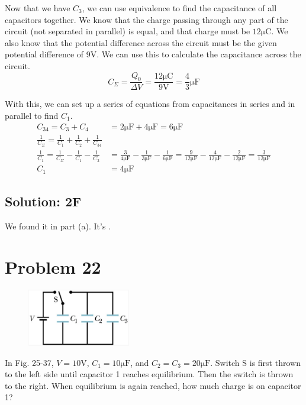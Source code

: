 \documentclass[12pt]{article}
\begin{document}
Now that we have $C_3$, we can use equivalence to find the capacitance of all capacitors together.
We know that the charge passing through any part of the circuit (not separated in parallel) is equal, and that charge must be $12\unit{\micro\coulomb}$.
We also know that the potential difference across the circuit must be the given potential difference of 9V. 
We can use this to calculate the capacitance across the circuit.
\[
    C_{\Sigma} = \frac{Q_0}{\Delta V} = \frac{12 \unit{\micro\coulomb}}{9 \unit{\volt}} = \frac{4}{3} \unit{\micro\farad}
\]

With this, we can set up a series of equations from capacitances in series and in parallel to find $C_1$.
\begin{align*}
    C_{34} = C_3 + C_4 &= 2 \unit{\micro\farad} + 4 \unit{\micro\farad} = 6 \unit{\micro\farad}\\
    \frac{1}{C_{\Sigma}} = \frac{1}{C_1} + \frac{1}{C_2} + \frac{1}{C_{34}}\\
    \frac{1}{C_1} = \frac{1}{C_{\Sigma}} - \frac{1}{C_1} - \frac{1}{C_2}
        &=  \frac{3}{4 \unit{\micro\farad}} - \frac{1}{3 \unit{\micro\farad}} - \frac{1}{6 \unit{\micro\farad}}
        =   \frac{9}{12 \unit{\micro\farad}} - \frac{4}{12 \unit{\micro\farad}} - \frac{2}{12 \unit{\micro\farad}}
        =   \frac{3}{12 \unit{\micro\farad}}\\
    C_1 &=  \boxed{4 \unit{\micro\farad}}
\end{align*}

\subsection{Solution: 2\textmu F}
We found it in part (a). It's \boxed{2\unit{\micro\farad}}.

\pagebreak
\section{Problem 22}
\begin{figure}
    \vspace{-30pt}
    \includegraphics[width=0.4\textwidth]{picture_5.png} 
\end{figure}
In Fig. 25-37, $V = 10 \unit{\volt}$, $C_1 = 10 \unit{\micro\farad}$, and $C_2 = C_3 = 20 \unit{\micro\farad}$. 
Switch S is first thrown to the left side until capacitor 1 reaches equilibrium. 
Then the switch is thrown to the right. 
When equilibrium is again reached, how much charge is on capacitor 1?
\end{document}
